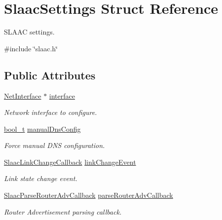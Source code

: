\hypertarget{structSlaacSettings}{}\section{Slaac\+Settings Struct Reference}
\label{structSlaacSettings}


S\+L\+A\+AC settings.  




{\ttfamily \#include \char`\"{}slaac.\+h\char`\"{}}

\subsection*{Public Attributes}
\begin{DoxyCompactItemize}
\item 
\hyperlink{net_8h_a2234db8911a1148c9159979d8f5e0d6b}{Net\+Interface} $\ast$ \hyperlink{structSlaacSettings_a28e99b4d9e098adc42fb1d29e8137977}{interface}
\begin{DoxyCompactList}\small\item\em Network interface to configure. \end{DoxyCompactList}\item 
\hyperlink{compiler__port_8h_a812d16e5494522586b3784e55d479912}{bool\+\_\+t} \hyperlink{structSlaacSettings_acf5b3baa56cbba942f4de3d80858c1c7}{manual\+Dns\+Config}
\begin{DoxyCompactList}\small\item\em Force manual D\+NS configuration. \end{DoxyCompactList}\item 
\hyperlink{slaac_8h_a73319c956fa99974c25aa3a770a2004c}{Slaac\+Link\+Change\+Callback} \hyperlink{structSlaacSettings_a5fe65a555b650fac3bc027f55b99151f}{link\+Change\+Event}
\begin{DoxyCompactList}\small\item\em Link state change event. \end{DoxyCompactList}\item 
\hyperlink{slaac_8h_a66c0e8308667df584798793bb1755415}{Slaac\+Parse\+Router\+Adv\+Callback} \hyperlink{structSlaacSettings_ad2dd037086f07cb77cd6ec8cc57a4414}{parse\+Router\+Adv\+Callback}
\begin{DoxyCompactList}\small\item\em Router Advertisement parsing callback. \end{DoxyCompactList}\end{DoxyCompactItemize}


